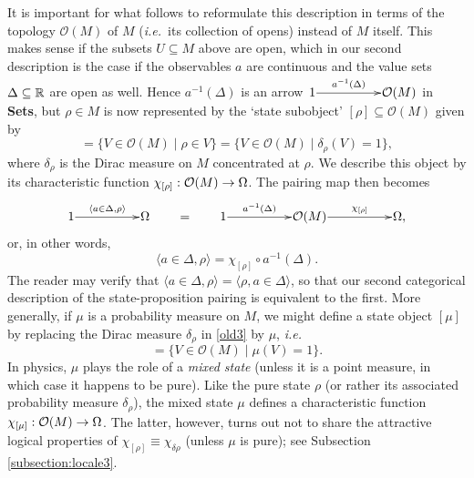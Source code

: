 \documentclass[11pt]{article}
\newcommand{\beq}{\begin{equation}}
\newcommand{\eeq}{\end{equation}}
\newcommand{\Sets}{\mbox{\textbf{Sets}}}
\newcommand{\raw}{\rightarrow} \newcommand{\rat}{\mapsto}
\newcommand{\inv}{^{-1}}
\newcommand{\er}{\eqref}
\newcommand{\dl}{\delta} \newcommand{\Dl}{\Delta}
\newcommand{\rh}{\rho} \newcommand{\sg}{\sigma}
\newcommand{\ch}{\chi} \newcommand{\ps}{\psi} \newcommand{\Ps}{\Psi}
\newcommand{\CO}{{\mathcal O}} \newcommand{\CP}{{\mathcal P}}
\newcommand{\ie}{\textit{i.e.}}
\begin{document}
It is important for what follows to reformulate this description in terms of
the topology $\CO(M)$ of $M$ (\ie\ its collection of opens) instead of $M$ itself.  This makes sense if the subsets $U\subseteq M$ above are open, which in our second description is the case if the observables $a$ are continuous and the value sets $\Dl\subseteq\R$ are open as well.  Hence $a\inv(\Dl)$ is an arrow
$\xymatrix@1{1\ar^-{a^{-1}(\Dl)}[rr] && \CO(M)}$ in \Sets, but $\rho\in M$ is now
represented by the `state subobject' \hbox{$[\rho]\subseteq\CO(M)$} given by
\beq
   [\rho]=\{V\in\CO(M)\mid \rho\in V\} =\{V\in\CO(M)\mid \dl_{\rho}(V)=1\},
   \label{old3}
\eeq
where $\dl_{\rho}$ is the Dirac measure on $M$ concentrated at $\rho$.
We describe this object by its characteristic function
$\ch_{[\rho]}:\CO(M)\raw\Om$. The pairing map then becomes
\beq
   \xymatrix@1{1\ar^-{\langle a\in \Dl,\rho \rangle}[rr]&&\Om}
   \qquad =\qquad
   \xymatrix@1{1\ar^-{a^{-1}(\Dl)}[rr] && \CO(M)
   \ar^-{\chi_{[\rho]}}[rr]&&\Om,} \label{spp}
\eeq
or, in other words,
\beq
\langle a\in \Dl,\rho \rangle=\chi_{[\rho]}\circ a^{-1}(\Dl).\label{circainv}\eeq
The reader may verify that $\langle a\in \Dl,\rho \rangle=\langle
\rho,a\in \Dl \rangle$, so that our second categorical description of the
state-proposition pairing is equivalent to the first. More generally, if $\mu$ is a probability measure on $M$, we might define a state object $[\mu]$ by replacing the Dirac measure $\dl_{\rh}$ in \er{old3} by $\mu$, \ie
\beq
   [\mu] =\{V\in\CO(M)\mid \mu(V)=1\}.
   \label{old3bis}
\eeq
In physics, $\mu$ plays the role of a {\it mixed state} (unless it is a point measure, in which case it happens to be pure). Like the pure state $\rh$ (or rather its associated probability measure
$\dl_{\rh}$), the mixed state $\mu$ defines a characteristic function $\ch_{[\mu]}:\CO(M)\raw\Om$. The latter, however, turns out
not to share the attractive logical properties of $\ch_{[\rh]}\equiv \ch_{\dl{\rh}}$ (unless $\mu$ is pure); see Subsection \ref{subsection:locale3}.
\end{document}
